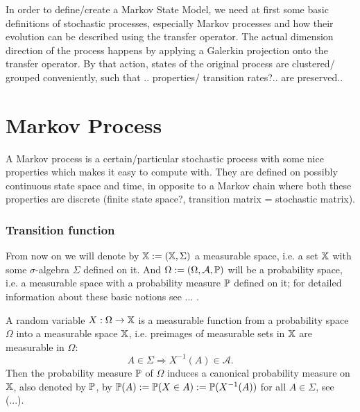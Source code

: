 
In order to define/create a Markov State Model, we need at first some basic definitions of stochastic processes, especially Markov processes and how their evolution can be described using the transfer operator. The actual dimension direction of the process happens by applying a Galerkin projection onto the transfer operator. By that action, states of the original process are clustered/ grouped conveniently, such that .. properties/ transition rates?.. are preserved..

\section{Markov Process}

A Markov process is a certain/particular stochastic process with some nice properties which makes it easy to compute with. They are defined on possibly continuous state space and time, in opposite to a Markov chain where both these properties are discrete (finite state space?, transition matrix = stochastic matrix).

\subsubsection*{Transition function}

From now on we will denote by $\mathbb{X} := (\mathbb{X},\Sigma)$ a measurable space, i.e. a set $\mathbb{X}$ with some $\sigma$-algebra $\Sigma$ defined on it. And $\Omega := (\Omega, \mathcal{A}, \mathbb{P})$ will be a probability space, i.e. a 
measurable space with a probability measure $\mathbb{P}$ defined on it; for detailed information about these basic notions see ... .

A random variable $X: \Omega \rightarrow \mathbb{X}$ is a measurable function from a probability space $\Omega$ into a measurable space $\mathbb{X}$, i.e. preimages of measurable sets in $\mathbb{X}$ are measurable in $\Omega$:
\begin{equation*}
A \in \Sigma \Rightarrow X^{-1}(A) \in \mathcal{A}.
\end{equation*}
Then the probability measure $\mathbb{P}$ of $\Omega$ induces a canonical probability measure on $\mathbb{X}$, also
denoted by $\mathbb{P}$, by $\mathbb{P}(A) := \mathbb{P}(X \in A) := \mathbb{P}(X^{-1}(A))$ for all $A \in \Sigma$, see (...).

